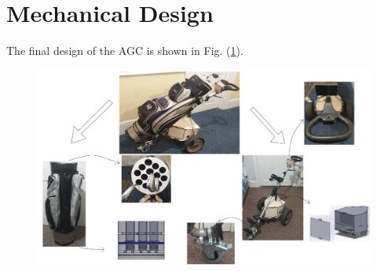\documentclass[11pt,landscape]{article}
\begin{document}
\section{Mechanical Design}
The final design of the AGC is shown in Fig. (\ref{fig:complete_design}).
\begin{figure}[H]
    \begin{center}
        \includegraphics[width=\textwidth]{Complete Design.PNG}
        \label{fig:complete_design}
    \end{center}
\end{figure}
\end{document}
